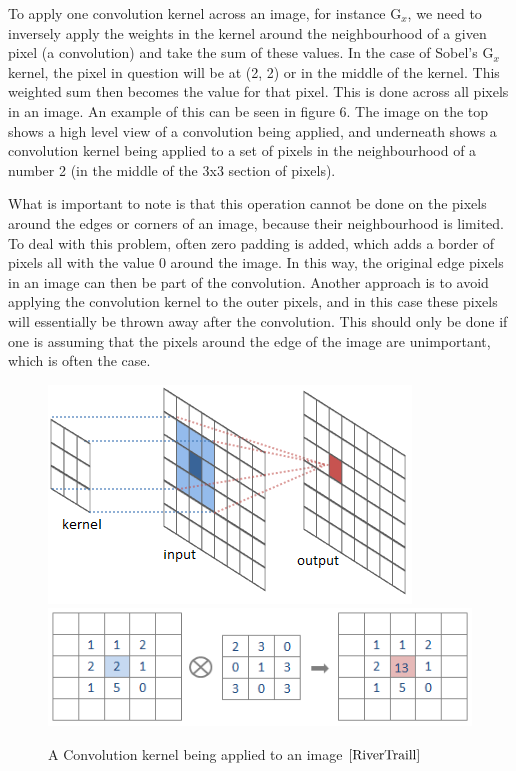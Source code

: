 \documentclass[12pt]{report} %
\begin{document}
	 To apply one convolution kernel across an image, for instance G$_{x}$, we need to inversely apply the weights in the kernel around the neighbourhood of a given pixel (a convolution) and take the sum of these values. In the case of Sobel's G$_{x}$ kernel, the pixel in question will be at (2, 2) or in the middle of the kernel. This weighted sum then becomes the value for that pixel. This is done across all pixels in an image\cite{RiverTraill}. 
	 An example of this can be seen in figure 6. The image on the top shows a high level view of a convolution being applied, and underneath shows a convolution kernel being applied to a set of pixels in the neighbourhood of a number 2 (in the middle of the 3x3 section of pixels).	 
	 
	 What is important to note is that this operation cannot be done on the pixels around the edges or corners of an image, because their neighbourhood is limited. To deal with this problem, often zero padding is added, which adds a border of pixels all with the value 0 around the image. In this way, the original edge pixels in an image can then be part of the convolution. \cite{R. Fisher, S. Perkins, A. Walker and E. Wolfart.} Another approach is to avoid applying the convolution kernel to the outer pixels, and in this case these pixels will essentially be thrown away after the convolution. This should only be done if one is assuming that the pixels around the edge of the image are unimportant, which is often the case.
	 
\begin{figure}
\centering
\includegraphics{RiverTrain-ImageConvDiagram} 
\includegraphics{convolution4}
\caption{A Convolution kernel being applied to an image $\cite{RiverTraill}$}
\end{figure}	 
	 
\end{document}
